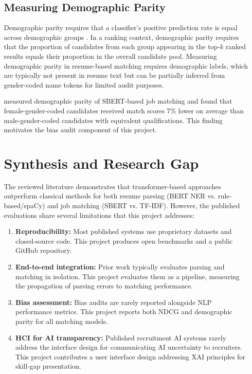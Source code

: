 \subsection{Measuring Demographic Parity}

Demographic parity requires that a classifier's positive prediction rate is equal across demographic groups \citep{Dwork2012}. In a ranking context, demographic parity requires that the proportion of candidates from each group appearing in the top-$k$ ranked results equals their proportion in the overall candidate pool. Measuring demographic parity in resume-based matching requires demographic labels, which are typically not present in resume text but can be partially inferred from gender-coded name tokens for limited audit purposes.

\citet{Qin2021} measured demographic parity of SBERT-based job matching and found that female-gender-coded candidates received match scores 7\% lower on average than male-gender-coded candidates with equivalent qualifications. This finding motivates the bias audit component of this project.

\section{Synthesis and Research Gap}
\label{sec:synthesis}

The reviewed literature demonstrates that transformer-based approaches outperform classical methods for both resume parsing (BERT NER vs. rule-based/spaCy) and job matching (SBERT vs. TF-IDF). However, the published evaluations share several limitations that this project addresses:

\begin{enumerate}
    \item \textbf{Reproducibility:} Most published systems use proprietary datasets and closed-source code. This project produces open benchmarks and a public GitHub repository.
    \item \textbf{End-to-end integration:} Prior work typically evaluates parsing and matching in isolation. This project evaluates them as a pipeline, measuring the propagation of parsing errors to matching performance.
    \item \textbf{Bias assessment:} Bias audits are rarely reported alongside NLP performance metrics. This project reports both NDCG and demographic parity for all matching models.
    \item \textbf{HCI for AI transparency:} Published recruitment AI systems rarely address the interface design for communicating AI uncertainty to recruiters. This project contributes a user interface design addressing XAI principles for skill-gap presentation.
\end{enumerate}

